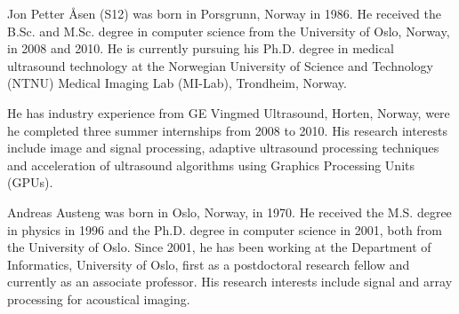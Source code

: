 \documentclass[draftcls]{IEEEtran}
\begin{document}

% 



\begin{IEEEbiography}{Jon Petter \AA{}sen}
(S12) was born in Porsgrunn, Norway in 1986. He received the B.Sc. and M.Sc. degree in computer science from the University of Oslo, Norway, in 2008 and 2010. He is currently pursuing his Ph.D. degree in medical ultrasound technology at the Norwegian University of Science and Technology (NTNU) Medical Imaging Lab (MI-Lab), Trondheim, Norway. 

He has industry experience from GE Vingmed Ultrasound, Horten, Norway, were he completed three summer internships from 2008 to 2010. His research interests include image and signal processing, adaptive ultrasound processing techniques and acceleration of ultrasound algorithms using Graphics Processing Units (GPUs). 
\end{IEEEbiography}

\vfill{}


\begin{IEEEbiography}{Andreas Austeng}
was born in Oslo, Norway, in 1970. He received the M.S. degree in physics in 1996 and the Ph.D. degree in computer science in 2001, both from the University of Oslo. Since 2001, he has been working at the Department of Informatics, University of Oslo, first as a postdoctoral research fellow and currently as an associate professor. His research interests include signal and array processing for acoustical imaging.
\end{IEEEbiography}
\end{document}
